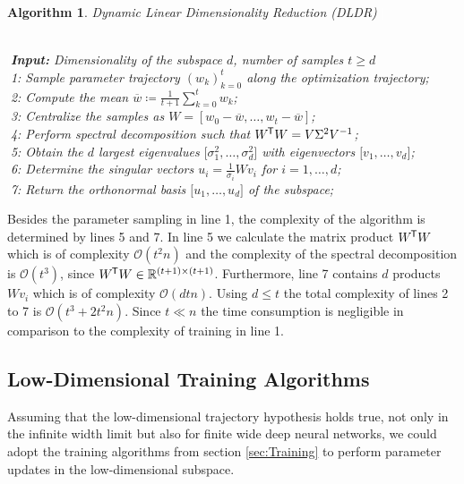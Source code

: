 \documentclass[11pt, a4paper]{article}
\newtheorem{algorithm}[theorem]{Algorithm}
\newcommand{\R}{\mathbb{R}}
\renewcommand{\O}{\mathcal{O}}
\newcommand*{\tr}{^{\mkern-1.5mu\mathsf{T}}}
\begin{document}
\begin{algorithm}
\caption{Dynamic Linear Dimensionality Reduction (DLDR) \textcolor{white}{$\Big |$}} \ \\
\textcolor{white}{$\Big |$}\textbf{Input:} Dimensionality of the subspace $d$, number of samples $t \geq d$ \\
\textcolor{white}{$\Big |$}1: Sample parameter trajectory $(w_k)_{k=0}^{t}$ along the optimization trajectory; \\
\textcolor{white}{$\Big |$}2: Compute the mean $\overline{w} \coloneq \frac{1}{t+1} \sum_{k=0}^{t} w_k$; \\
\textcolor{white}{$\Big |$}3: Centralize the samples as $W = [w_0-\overline{w}, \dots, w_t - \overline{w}]$; \\
\textcolor{white}{$\Big |$}4: Perform spectral decomposition such that $W\tr W = V \Sigma^2 V^{-1}$;  \\
\textcolor{white}{$\Big |$}5: Obtain the $d$ largest eigenvalues $\big [\sigma_1^2, \dots, \sigma_d^2 \big ]$ with eigenvectors $ \big [v_1, \dots, v_d \big ]$; \\
\textcolor{white}{$\Big |$}6: Determine the singular vectors $u_i = \frac{1}{\sigma_i}Wv_i$ for $i=1, \dots, d$; \\
\textcolor{white}{$\Big |$}7: Return the orthonormal basis $ \big [u_1, \dots, u_d \big ]$ of the subspace;
\end{algorithm}

Besides the parameter sampling in line 1, the complexity of the algorithm is determined by lines 5 and 7. In line 5 we calculate the matrix product $W \tr W$ which is of complexity $\O(t^2n)$ and the complexity of the spectral decomposition is $\O(t^3)$, since $W\tr W \in \R^{(t+1) \times (t+1)}$. Furthermore, line 7 contains $d$ products $Wv_i$ which is of complexity $\O(dtn)$. Using $d\leq t$ the total complexity of lines 2 to 7 is $\O(t^3 + 2t^2n)$. Since $t \ll n$ the time consumption is negligible in comparison to the complexity of training in line 1.

\subsection{Low-Dimensional Training Algorithms}

Assuming that the low-dimensional trajectory hypothesis holds true, not only in the infinite width limit but also for finite wide deep neural networks, we could adopt the training algorithms from section \ref{sec:Training} to perform parameter updates in the low-dimensional subspace. \\
\end{document}
